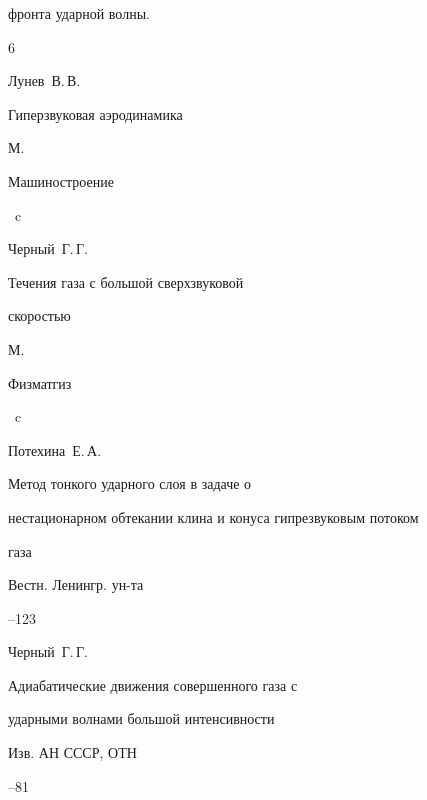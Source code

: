 фронта ударной волны.





\newpage


\begin{thebibliography}{6}




\by Лунев~В.\,В.


\book  Гиперзвуковая аэродинамика


\publaddr М.


\publ Машиностроение




~c







\by Черный~Г.\,Г.


\book  Течения газа с большой сверхзвуковой


скоростью


\publaddr М.


\publ Физматгиз




~c







\by Потехина~Е.\,А.


\paper Метод тонкого ударного слоя в задаче о


нестационарном обтекании клина и конуса гипрезвуковым потоком


газа


\jour  Вестн. Ленингр. ун-та






--123







\by Черный~Г.\,Г.


\paper  Адиабатические движения совершенного газа с


ударными волнами большой интенсивности


\jour Изв. АН СССР,  ОТН






--81






\end{thebibliography}
